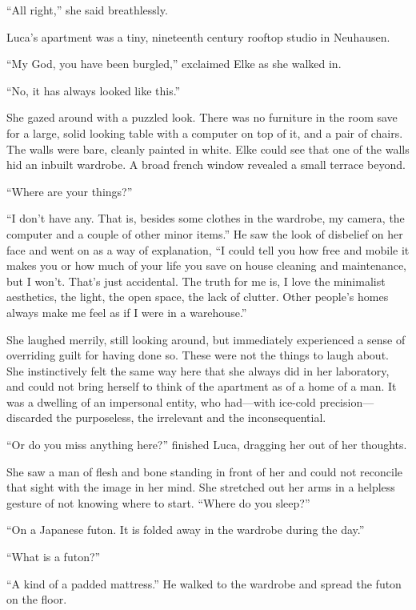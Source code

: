 ``All right,'' she said breathlessly.

\sectionline

Luca's apartment was a tiny, nineteenth century rooftop studio in Neuhausen.

``My God, you have been burgled,'' exclaimed Elke as she walked in.

``No, it has always looked like this.''

She gazed around with a puzzled look. There was no furniture in the room save for a large, solid looking table with a computer on top of it, and a pair of chairs. The walls were bare, cleanly painted in white. Elke could see that one of the walls hid an inbuilt wardrobe. A broad french window revealed a small terrace beyond.

``Where are your things?''

``I don't have any. That is, besides some clothes in the wardrobe, my camera, the computer and a couple of other minor items.'' He saw the look of disbelief on her face and went on as a way of explanation, ``I could tell you how free and mobile it makes you or how much of your life you save on house cleaning and maintenance, but I won't. That's just accidental. The truth for me is, I love the minimalist aesthetics, the light, the open space, the lack of clutter. Other people's homes always make me feel as if I were in a warehouse.''

She laughed merrily, still looking around, but immediately experienced a sense of overriding guilt for having done so. These were not the things to laugh about. She instinctively felt the same way here that she always did in her laboratory, and could not bring herself to think of the apartment as of a home of a man. It was a dwelling of an impersonal entity, who had---with ice-cold precision---discarded the purposeless, the irrelevant and the inconsequential.

``Or do you miss anything here?'' finished Luca, dragging her out of her thoughts.

She saw a man of flesh and bone standing in front of her and could not reconcile that sight with the image in her mind. She stretched out her arms in a helpless gesture of not knowing where to start. ``Where do you sleep?''

``On a Japanese futon. It is folded away in the wardrobe during the day.''

``What is a futon?''

``A kind of a padded mattress.'' He walked to the wardrobe and spread the futon on the floor.

